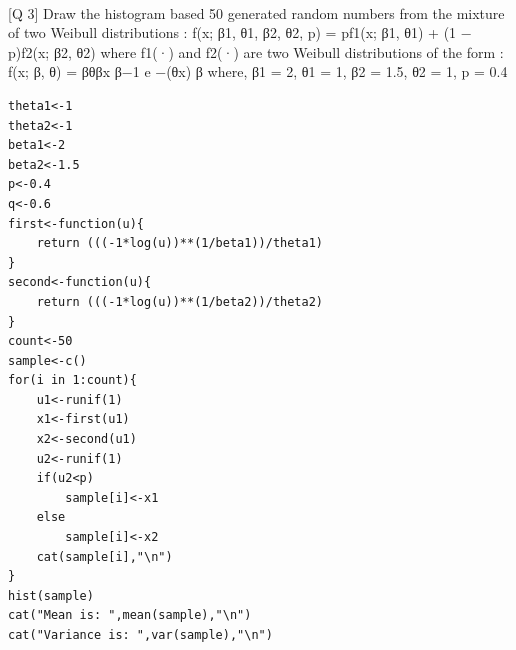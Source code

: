 \documentclass[11pt]{article}
\begin{document}
\begin{figure}[H]
  \centering
 \\
\end{figure}

[Q 3] Draw the histogram based 50 generated random numbers from the mixture of two
Weibull distributions :
f(x; β1, θ1, β2, θ2, p) = pf1(x; β1, θ1) + (1 − p)f2(x; β2, θ2)
where f1(·) and f2(·) are two Weibull distributions of the form : f(x; β, θ) = βθβx
β−1
e
−(θx)
β
where, β1 = 2, θ1 = 1, β2 = 1.5, θ2 = 1, p = 0.4


\begin{lstlisting}
theta1<-1
theta2<-1
beta1<-2
beta2<-1.5
p<-0.4
q<-0.6
first<-function(u){
	return (((-1*log(u))**(1/beta1))/theta1)
}
second<-function(u){
	return (((-1*log(u))**(1/beta2))/theta2)
}
count<-50
sample<-c()
for(i in 1:count){
	u1<-runif(1)
	x1<-first(u1)
	x2<-second(u1)
	u2<-runif(1)
	if(u2<p)
		sample[i]<-x1
	else
		sample[i]<-x2
	cat(sample[i],"\n")
}
hist(sample)
cat("Mean is: ",mean(sample),"\n")
cat("Variance is: ",var(sample),"\n")

\end{lstlisting}
\end{document}
